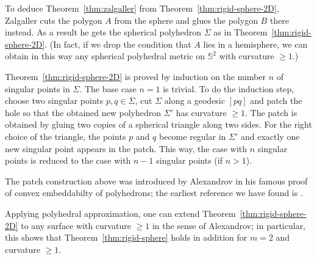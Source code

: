 \documentclass[oneside,a4paper]{article}
\begin{document}
To deduce Theorem~\ref{thm:zalgaller} from Theorem~\ref{thm:rigid-sphere-2D},
Zalgaller cuts the polygon $A$ from the sphere and glues the polygon $B$ there instead.
As a result he gets the spherical polyhedron $\Sigma$ as in Theorem~\ref{thm:rigid-sphere-2D}.
(In fact, if we drop the condition that $A$ lies in a hemisphere,
we can obtain in this way any spherical polyhedral metric on $\mathbb S^2$ with curvature $\ge 1$.)

Theorem~\ref{thm:rigid-sphere-2D} is proved by induction
on the number $n$ of singular points in $\Sigma$.
The base case $n=1$ is trivial.
To do the induction step,
choose two singular points $p, q\in\Sigma$,
cut $\Sigma$ along a geodesic $[pq]$
and patch the hole so that the obtained new polyhedron $\Sigma'$ has curvature $\ge 1$.
The patch is obtained by gluing two copies of a
spherical triangle along two sides.
For the right choice of the triangle,
the points $p$ and $q$ become regular in $\Sigma'$
and exactly one new singular point appears in the patch.
This way, the case with $n$ singular points is reduced
to the case with $n-1$ singular points (if $n>1$).

The patch construction above was introduced by Alexandrov
in his famous proof of convex embeddabilty of polyhedrons;
the earliest reference we have found is
\cite[VI, \S7]{alexandrov1948}.

Applying polyhedral approximation, one can extend Theorem~\ref{thm:rigid-sphere-2D}
to any surface with curvature $\ge 1$ in the sense of Alexandrov;
in particular, this shows that Theorem~\ref{thm:rigid-sphere} holds in addition for $m=2$ and curvature $\ge 1$.
\end{document}
